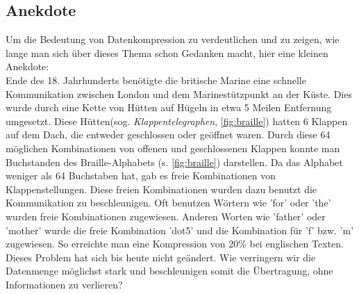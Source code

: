 \documentclass[a4paper,11pt]{scrartcl}%
\theoremstyle{change}
\theoremstyle{nonumberplain}
\theoremstyle{change}
\theoremstyle{nonumberplain}
\theoremstyle{change}
\theoremstyle{nonumberplain}
\begin{document}
\subsection{Anekdote}
Um die Bedeutung von Datenkompression zu verdeutlichen und zu zeigen, wie lange man sich über dieses Thema schon Gedanken macht, hier eine kleinen Anekdote:\\
Ende des 18. Jahrhunderts benötigte die britische Marine eine schnelle Kommunikation zwischen London und dem Marinestützpunkt an der Küste. Dies wurde durch eine Kette von Hütten auf Hügeln in etwa 5 Meilen Entfernung umgesetzt. Diese Hütten(sog. \textit{Klappentelegraphen}, \autoref{fig:braille}) hatten 6 Klappen auf dem Dach, die entweder geschlossen oder geöffnet waren. Durch diese 64 möglichen Kombinationen von offenen und geschlossenen Klappen konnte man Buchstanden des Braille-Alphabets (s. \autoref{fig:braille}) darstellen. Da das Alphabet weniger als 64 Buchstaben hat, gab es freie Kombinationen von Klappenstellungen. Diese freien Kombinationen wurden dazu benutzt die Kommunikation zu beschleunigen. Oft benutzen Wörtern wie 'for' oder 'the' wurden freie Kombinationen zugewiesen. Anderen Worten wie 'father' oder 'mother' wurde die freie Kombination 'dot5' und die Kombination für 'f' bzw. 'm' zugewiesen. So erreichte man eine Kompression von 20\% bei englischen Texten.\cite[S.1-4]{bellTextCompression} \\
Dieses Problem hat sich bis heute nicht geändert. Wie verringern wir die Datenmenge möglichst stark und beschleunigen somit die Übertragung, ohne Informationen zu verlieren?
\end{document}

